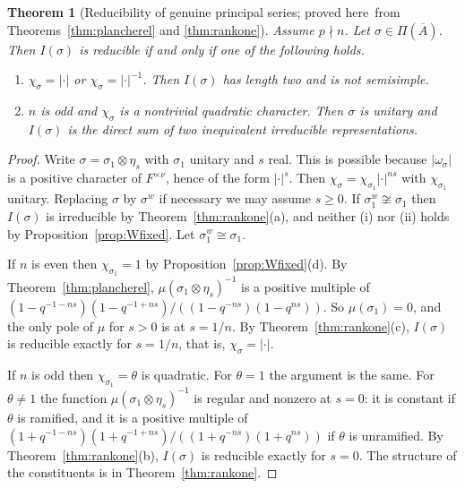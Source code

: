 \documentclass[12pt,letterpaper]{article}
\numberwithin{equation}{section}
\newtheorem{xtheorem}[theorem]{Theorem}
\theoremstyle{definition}
\newcommand{\proved}{proved here}
\newcommand{\bA}{\overline{A}}
\begin{document}
\begin{xtheorem}[Reducibility of genuine principal series; \proved\ from
Theorems~\ref{thm:plancherel} and \ref{thm:rankone}]\label{thm:reducibility}
Assume $p\nmid n$.  Let $\sigma\in\Pi(\bA)$.  Then $I(\sigma)$ is reducible if and only if
one of the following holds.
\begin{enumerate}[label=(\roman*),leftmargin=*,itemsep=1pt]
\item $\chi_\sigma=|\cdot|$ or $\chi_\sigma=|\cdot|^{-1}$.  Then $I(\sigma)$ has length two
and is not semisimple.
\item $n$ is odd and $\chi_\sigma$ is a nontrivial quadratic character.  Then $\sigma$ is
unitary and $I(\sigma)$ is the direct sum of two inequivalent irreducible representations.
\end{enumerate}
\end{xtheorem}
\begin{proof}
Write $\sigma=\sigma_1\otimes\eta_s$ with $\sigma_1$ unitary and $s$ real.  This is possible
because $|\omega_\sigma|$ is a positive character of $F^{\times\nu}$, hence of the form
$|\cdot|^s$.  Then $\chi_\sigma=\chi_{\sigma_1}|\cdot|^{ns}$ with $\chi_{\sigma_1}$ unitary.
Replacing $\sigma$ by $\sigma^w$ if necessary we may assume $s\ge0$.  If
$\sigma_1^w\not\cong\sigma_1$ then $I(\sigma)$ is irreducible by
Theorem~\ref{thm:rankone}(a), and neither (i) nor (ii) holds by
Proposition~\ref{prop:Wfixed}.  Let $\sigma_1^w\cong\sigma_1$.

If $n$ is even then $\chi_{\sigma_1}=1$ by Proposition~\ref{prop:Wfixed}(d).  By
Theorem~\ref{thm:plancherel}, $\mu(\sigma_1\otimes\eta_s)^{-1}$ is a positive multiple of
$(1-q^{-1-ns})(1-q^{-1+ns})/((1-q^{-ns})(1-q^{ns}))$.  So $\mu(\sigma_1)=0$, and the only pole
of $\mu$ for $s>0$ is at $s=1/n$.  By Theorem~\ref{thm:rankone}(c), $I(\sigma)$ is reducible
exactly for $s=1/n$, that is, $\chi_\sigma=|\cdot|$.

If $n$ is odd then $\chi_{\sigma_1}=\theta$ is quadratic.  For $\theta=1$ the argument is
the same.  For $\theta\ne1$ the function $\mu(\sigma_1\otimes\eta_s)^{-1}$ is regular and
nonzero at $s=0$: it is constant if $\theta$ is ramified, and it is a positive multiple of
$(1+q^{-1-ns})(1+q^{-1+ns})/((1+q^{-ns})(1+q^{ns}))$ if $\theta$ is unramified.  By
Theorem~\ref{thm:rankone}(b), $I(\sigma)$ is reducible exactly for $s=0$.  The structure of
the constituents is in Theorem~\ref{thm:rankone}.
\end{proof}
\end{document}
